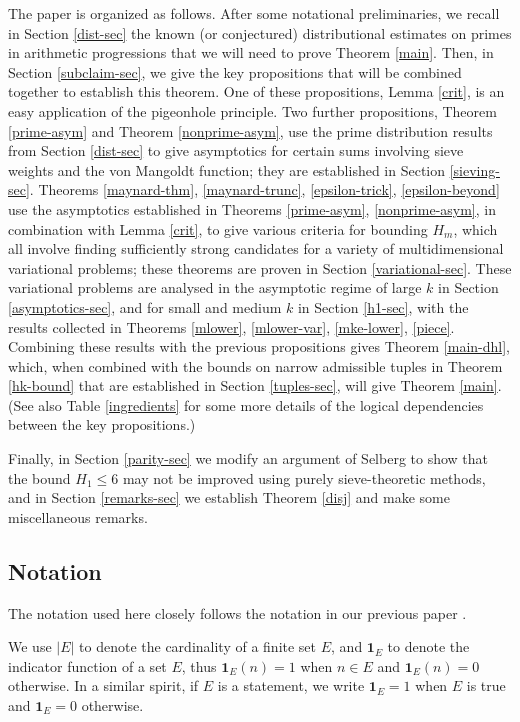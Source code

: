 \documentclass{bmcart}
\theoremstyle{plain}
\theoremstyle{definition}
\newcommand{\onef}{\mathbf{1}}
\begin{document}
The paper is organized as follows.  After some notational preliminaries, we recall in Section \ref{dist-sec} the known (or conjectured) distributional estimates on primes in arithmetic progressions that we will need to prove Theorem \ref{main}.  Then, in Section \ref{subclaim-sec}, we give the key propositions that will be combined together to establish this theorem.  One of these propositions, Lemma \ref{crit}, is an easy application of the pigeonhole principle.  Two further propositions, Theorem \ref{prime-asym} and Theorem \ref{nonprime-asym}, use the prime distribution results from Section \ref{dist-sec} to give asymptotics for certain sums involving sieve weights and the von Mangoldt function; they are established in Section \ref{sieving-sec}.  Theorems \ref{maynard-thm}, \ref{maynard-trunc}, \ref{epsilon-trick}, \ref{epsilon-beyond} use the asymptotics established in Theorems \ref{prime-asym}, \ref{nonprime-asym}, in combination with Lemma \ref{crit}, to give various criteria for bounding $H_m$, which all involve finding sufficiently strong candidates for a variety of multidimensional variational problems; these theorems are proven in Section \ref{variational-sec}.  These variational problems are analysed in the asymptotic regime of large $k$ in Section \ref{asymptotics-sec}, and for small and medium $k$ in Section \ref{h1-sec}, with the results collected in Theorems \ref{mlower}, \ref{mlower-var}, \ref{mke-lower}, \ref{piece}.  Combining these results with the previous propositions gives Theorem \ref{main-dhl}, which, when combined with the bounds on narrow admissible tuples in Theorem \ref{hk-bound} that are established in Section \ref{tuples-sec}, will give Theorem \ref{main}.  (See also Table \ref{ingredients} for some more details of the logical dependencies between the key propositions.)

Finally, in Section \ref{parity-sec} we modify an argument of Selberg to show that the bound $H_1 \leq 6$ may not be improved using purely sieve-theoretic methods, and in Section \ref{remarks-sec} we establish Theorem \ref{disj} and make some miscellaneous remarks.

\subsection{Notation}

The notation used here closely follows the notation in our previous paper \cite{polymath8a}.

We use $|E|$ to denote the cardinality of a finite set $E$, and $\onef_E$ to denote the indicator function of a set $E$, thus $\onef_E(n)=1$ when $n \in E$ and $\onef_E(n)=0$ otherwise.  In a similar spirit, if $E$ is a statement, we write $\onef_E=1$ when $E$ is true and $\onef_E=0$ otherwise. 
\end{document}
